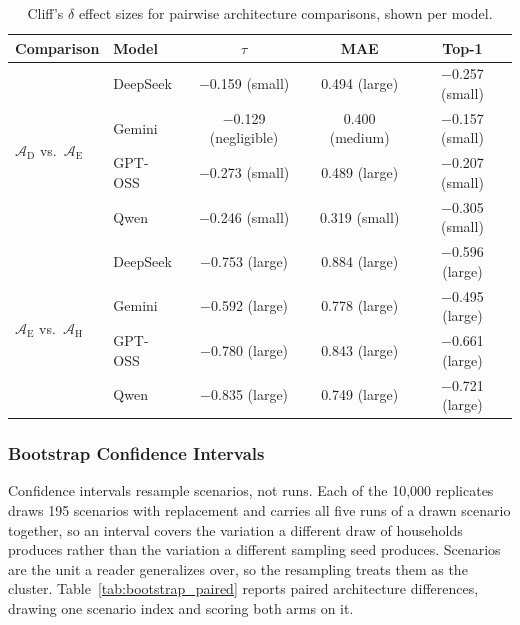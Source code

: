 \documentclass[11pt]{article}
\begin{document}
\begin{table}[htbp]
\centering
\small
\centering
\renewcommand{\arraystretch}{1.10}
\caption{Cliff's $\delta$ effect sizes for pairwise architecture comparisons, shown per model.}
\label{tab:effect_sizes}
\begin{tabular}{@{}l l ccc@{}}
\toprule
Comparison & Model & $\tau$ & MAE & Top-1 \\
\midrule
\multirow{4}{*}{$\mathcal{A}_{\text{D}}$ vs.\ $\mathcal{A}_{\text{E}}$}
 & DeepSeek & $-$0.159 (small) & 0.494 (large) & $-$0.257 (small) \\
 & Gemini & $-$0.129 (negligible) & 0.400 (medium) & $-$0.157 (small) \\
 & GPT-OSS & $-$0.273 (small) & 0.489 (large) & $-$0.207 (small) \\
 & Qwen & $-$0.246 (small) & 0.319 (small) & $-$0.305 (small) \\
\midrule
\multirow{4}{*}{$\mathcal{A}_{\text{E}}$ vs.\ $\mathcal{A}_{\text{H}}$}
 & DeepSeek & $-$0.753 (large) & 0.884 (large) & $-$0.596 (large) \\
 & Gemini & $-$0.592 (large) & 0.778 (large) & $-$0.495 (large) \\
 & GPT-OSS & $-$0.780 (large) & 0.843 (large) & $-$0.661 (large) \\
 & Qwen & $-$0.835 (large) & 0.749 (large) & $-$0.721 (large) \\
\bottomrule
\end{tabular}
\renewcommand{\arraystretch}{1.0}
\end{table}

\subsubsection{Bootstrap Confidence Intervals}

Confidence intervals resample scenarios, not runs. Each of the 10,000 replicates draws 195 scenarios with replacement and carries all five runs of a drawn scenario together, so an interval covers the variation a different draw of households produces rather than the variation a different sampling seed produces. Scenarios are the unit a reader generalizes over, so the resampling treats them as the cluster. Table~\ref{tab:bootstrap_paired} reports paired architecture differences, drawing one scenario index and scoring both arms on it.
\end{document}
